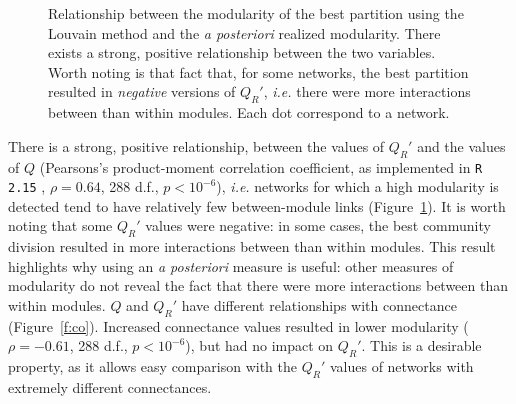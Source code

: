 \documentclass[12pt,oneside]{article}
\begin{document}
\begin{figure}[tbp]
	\begin{center}
	\end{center}
	\caption{Relationship between the modularity of the best partition using the Louvain method and the \emph{a posteriori} realized modularity. There exists a strong, positive relationship between the two variables. Worth noting is that fact that, for some networks, the best partition resulted in \emph{negative} versions of $Q_R'$, \emph{i.e.} there were more interactions between than within modules. Each dot correspond to a network.}
	\label{f:qqr}
\end{figure}

There is a strong, positive relationship, between the values of $Q_R'$ and the
values of $Q$ (Pearsons's product-moment correlation coefficient, as implemented in \texttt{R 2.15} \cite{team_r:_2008}, $\rho =
0.64$, 288 d.f., $p < 10^{-6}$), \emph{i.e.} networks for which a high
modularity is detected tend to have relatively few between-module links
(Figure~\ref{f:qqr}). It is worth noting that some $Q_R'$ values were negative:
in some cases, the best community division resulted in more interactions
between than within modules. This result highlights why using an \emph{a
posteriori} measure is useful: other measures of modularity do not reveal the
fact that there were more interactions between than within modules. $Q$ and
$Q_R'$ have different relationships with connectance (Figure~\ref{f:co}).
Increased connectance values resulted in lower modularity ($\rho = -0.61$, 288
d.f., $p < 10^{-6}$), but had no impact on $Q_R'$. This is a desirable
property, as it allows easy comparison with the $Q_R'$ values of networks with
extremely different connectances.
\end{document}
